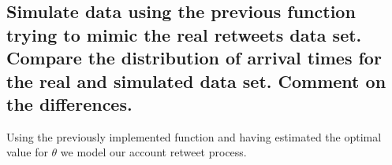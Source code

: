 \subsection{Simulate data using the previous function trying to mimic the real retweets data set. Compare the distribution of arrival times for the real and simulated data set. Comment on the differences.}

Using the previously implemented function and having estimated the optimal value for $\theta$ we model our account retweet process.

 